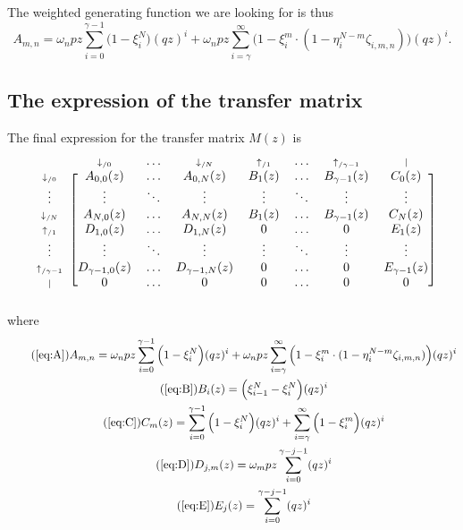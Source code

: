\documentclass{article}
\newcommand{\dn}[1]{\scriptstyle{\downarrow_{/#1}}}
\newcommand{\up}[1]{\scriptstyle{\uparrow_{/#1}}}
\newcommand{\nd}{\scriptstyle{|}}
\begin{document}
The weighted generating function we are looking for is thus
\begin{equation}
\label{eq:A}
A_{m,n} =
\omega_n pz \sum_{i=0}^{\gamma-1} \Big(1 - \xi_i^N \Big) (qz)^i + \omega_n
pz \sum_{i=\gamma}^\infty \Big(1 - \xi_i^m \cdot (1- \eta_i^{N-m}
\zeta_{i,m,n}) \Big) (qz)^i.
\end{equation}

\subsection{The expression of the transfer matrix}

The final expression for the transfer matrix $M(z)$ is
\begin{equation*}
\begin{blockarray}{cccccccc}
   & \dn{0} & \ldots & \dn{N} & \up{1} & \ldots & \up{\gamma-1} & \nd \\
\begin{block}{c[ccccccc]}
\dn{0} & A_{0,0}(z) & \ldots & A_{0,N}(z) & B_1(z) & \ldots &
    B_{\gamma-1}(z) & C_0(z) \\
\vdots & \vdots & \ddots & \vdots & \vdots & \ddots &
    \vdots & \vdots \\
\dn{N} & A_{N,0}(z) & \ldots & A_{N,N}(z) & B_1(z) & \ldots &
    B_{\gamma-1}(z) & C_N(z) \\
\up{1} & D_{1,0}(z) & \ldots & D_{1,N}(z) & 0 & \ldots & 0 & E_1(z) \\
\vdots & \vdots & \ddots & \vdots & \vdots & \ddots &
    \vdots & \vdots \\
\up{\gamma-1} & D_{\gamma-1,0}(z) & \ldots & D_{\gamma-1,N}(z) & 0 &
  \ldots & 0 & E_{\gamma-1}(z) \\
\nd & 0 & \ldots & 0 & 0 & \ldots & 0 & 0 \\
\end{block}
\end{blockarray}
\end{equation*}
where
\begin{gather}
\tag{\ref{eq:A}}
A_{m,n} =
\omega_n pz \sum_{i=0}^{\gamma-1} \Big(1 - \xi_i^N \Big) (qz)^i + \omega_n
pz \sum_{i=\gamma}^\infty \Big(1 - \xi_i^m \cdot (1- \eta_i^{N-m}
\zeta_{i,m,n}) \Big) (qz)^i \\
\tag{\ref{eq:B}}
B_i(z) = \Big( \xi_{i-1}^N-\xi_i^N \Big) (qz)^i \\
\tag{\ref{eq:C}}
C_m(z) =
\sum_{i=0}^{\gamma-1} \Big(1 - \xi_i^N \Big) (qz)^i +
  \sum_{i=\gamma}^\infty \Big(1 - \xi_i^m \Big) (qz)^i \\
\tag{\ref{eq:D}}
D_{j,m}(z) = \omega_m pz \sum_{i=0}^{\gamma-j-1} (qz)^i \\
\tag{\ref{eq:E}}
E_j(z) = \sum_{i=0}^{\gamma-j-1} (qz)^i
\end{gather}
\end{document}
